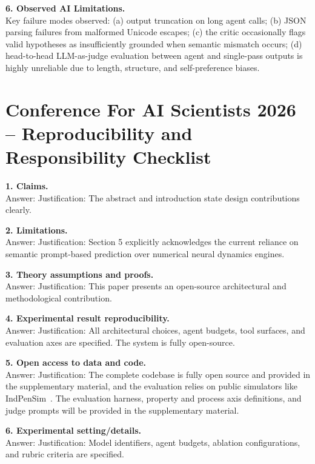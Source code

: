 \documentclass[11pt]{article}
\begin{document}
\textbf{6. Observed AI Limitations.}\\
Key failure modes observed: (a) output truncation on long agent calls; (b) JSON parsing failures from malformed Unicode escapes; (c) the critic occasionally flags valid hypotheses as insufficiently grounded when semantic mismatch occurs; (d) head-to-head LLM-as-judge evaluation between agent and single-pass outputs is highly unreliable due to length, structure, and self-preference biases.

\section*{Conference For AI Scientists 2026 -- Reproducibility and Responsibility Checklist}

\textbf{1. Claims.}\\
Answer: \answerYes Justification: The abstract and introduction state design contributions clearly. 

\textbf{2. Limitations.}\\
Answer: \answerYes Justification: Section 5 explicitly acknowledges the current reliance on semantic prompt-based prediction over numerical neural dynamics engines.

\textbf{3. Theory assumptions and proofs.}\\
Answer: \answerNA Justification: This paper presents an open-source architectural and methodological contribution.

\textbf{4. Experimental result reproducibility.}\\
Answer: \answerYes Justification: All architectural choices, agent budgets, tool surfaces, and evaluation axes are specified. The system is fully open-source.

\textbf{5. Open access to data and code.}\\
Answer: \answerYes Justification: The complete codebase is fully open source and provided in the supplementary material, and the evaluation relies on public simulators like IndPenSim~\citep{goldrick2015}. The evaluation harness, property and process axis definitions, and judge prompts will be provided in the supplementary material.

\textbf{6. Experimental setting/details.}\\
Answer: \answerYes Justification: Model identifiers, agent budgets, ablation configurations, and rubric criteria are specified.
\end{document}
